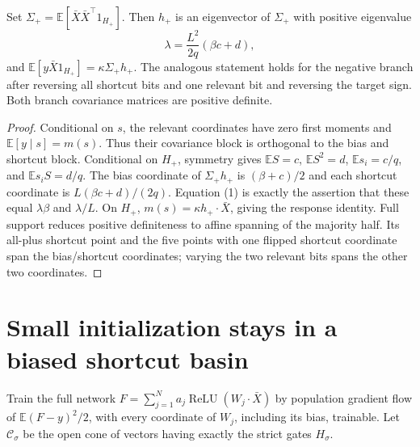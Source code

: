 \documentclass[11pt]{article}
\newcommand{\E}{\mathbb E}\newcommand{\R}{\mathbb R}
\begin{document}
\begin{lemma}
Set $\Sigma_+=\E[\bar X\bar X^\top 1_{H_+}]$. Then $h_+$ is an
eigenvector of $\Sigma_+$ with positive eigenvalue
\[
 \lambda=\frac{L^2}{2q}(\beta c+d),
\]
and $\E[y\bar X1_{H_+}]=\kappa\Sigma_+h_+$.
The analogous statement holds for the negative branch after reversing
all shortcut bits and one relevant bit and reversing the target sign.
Both branch covariance matrices are positive definite.
\end{lemma}
\begin{proof}
Conditional on $s$, the relevant coordinates have zero first moments
and $\E[y\mid s]=m(s)$. Thus their covariance block is orthogonal
to the bias and shortcut block. Conditional on $H_+$, symmetry gives
$\E S=c$, $\E S^2=d$, $\E s_i=c/q$, and $\E s_i S=d/q$.
The bias coordinate of $\Sigma_+h_+$ is $(\beta+c)/2$ and each
shortcut coordinate is $L(\beta c+d)/(2q)$. Equation (1) is exactly
the assertion that these equal $\lambda\beta$ and $\lambda/L$.
On $H_+$, $m(s)=\kappa h_+\cdot\bar X$, giving the response identity.
Full support reduces positive definiteness to affine spanning of the
majority half. Its all-plus shortcut point and the five points with
one flipped shortcut coordinate span the bias/shortcut coordinates;
varying the two relevant bits spans the other two coordinates.
\end{proof}

\section{Small initialization stays in a biased shortcut basin}
Train the full network
$F=\sum_{j=1}^N a_j\operatorname{ReLU}(W_j\cdot\bar X)$ by
population gradient flow of $\E(F-y)^2/2$, with every coordinate of
$W_j$, including its bias, trainable. Let $\mathcal C_\sigma$ be the
open cone of vectors having exactly the strict gates $H_\sigma$.
\end{document}
